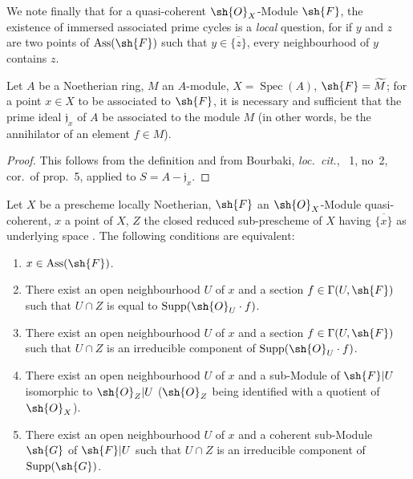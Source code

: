 We note finally that for a quasi-coherent $\sh{O}_X$-Module $\sh{F}$, the existence of immersed associated prime cycles is a \emph{local} question, for if $y$ and $z$ are two points of $\operatorname{Ass}(\sh{F})$ such that $y\in\overline{\{z\}}$, every neighbourhood of $y$ contains $z$.

\begin{proposition}[3.1.2]
\label{IV.3.1.2}
Let $A$ be a Noetherian ring, $M$ an $A$-module, $X=\operatorname{Spec}(A)$, $\sh{F}=\widetilde{M}$; for a point $x\in X$ to be associated to $\sh{F}$, it is necessary and sufficient that the prime ideal $\mathfrak{j}_x$ of $A$ be associated to the module $M$ (in other words, be the annihilator of an element $f\in M$).
\end{proposition}

\begin{proof}
This follows from the definition  and from Bourbaki, \emph{loc.\ cit.}, \textsection~1, no~2, cor.\ of prop.~5, applied to $S=A-\mathfrak{j}_x$.
\end{proof}

\begin{proposition}[3.1.3]
\label{IV.3.1.3}
Let $X$ be a prescheme locally Noetherian, $\sh{F}$ an $\sh{O}_X$-Module quasi-coherent, $x$ a point of $X$, $Z$ the closed reduced sub-prescheme of $X$ having $\overline{\{x\}}$ as underlying space .
The following conditions are equivalent:
\begin{enumerate}[label=\emph{\alph*)}]
  \item $x\in\operatorname{Ass}(\sh{F})$.
  \item There exist an open neighbourhood $U$ of $x$ and a section $f\in\Gamma(U,\sh{F})$ such that $U\cap Z$ is equal to $\operatorname{Supp}(\sh{O}_U\cdot f)$.
  \item[\rm b$'$)] There exist an open neighbourhood $U$ of $x$ and a section $f\in\Gamma(U,\sh{F})$ such that $U\cap Z$ is an irreducible component of $\operatorname{Supp}(\sh{O}_U\cdot f)$.
  \item There exist an open neighbourhood $U$ of $x$ and a sub-Module of $\sh{F}|U$ isomorphic to $\sh{O}_Z|U$ ($\sh{O}_Z$ being identified with a quotient of $\sh{O}_X$).
  \item[\rm c$'$)] There exist an open neighbourhood $U$ of $x$ and a coherent sub-Module $\sh{G}$ of $\sh{F}|U$ such that $U\cap Z$ is an irreducible component of $\operatorname{Supp}(\sh{G})$.
\end{enumerate}
\end{proposition}

